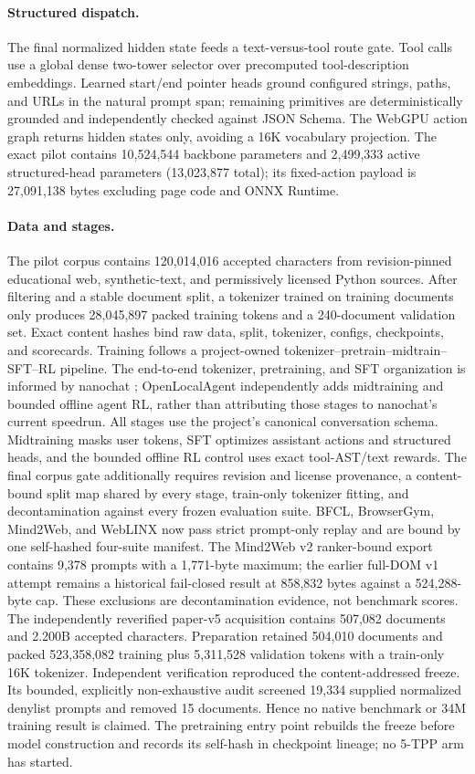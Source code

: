\documentclass{article}
\begin{document}
\paragraph{Structured dispatch.}
The final normalized hidden state feeds a text-versus-tool route gate.  Tool calls use a global
dense two-tower selector over precomputed tool-description embeddings.  Learned start/end pointer
heads ground configured strings, paths, and URLs in the natural prompt span; remaining primitives
are deterministically grounded and independently checked against JSON Schema.  The WebGPU action
graph returns hidden states only, avoiding a 16K vocabulary projection.  The exact pilot contains
10,524,544 backbone parameters and 2,499,333 active structured-head parameters (13,023,877 total);
its fixed-action payload is 27,091,138 bytes excluding page code and ONNX Runtime.

\paragraph{Data and stages.}
The pilot corpus contains 120,014,016 accepted characters from revision-pinned educational web,
synthetic-text, and permissively licensed Python sources.  After filtering and a stable document
split, a tokenizer trained on training documents only produces 28,045,897 packed training tokens
and a 240-document validation set.  Exact content hashes bind raw data, split, tokenizer, configs,
checkpoints, and scorecards.  Training follows a project-owned
tokenizer--pretrain--midtrain--SFT--RL pipeline.  The end-to-end tokenizer, pretraining, and SFT
organization is informed by nanochat \citep{karpathy2025nanochat}; OpenLocalAgent independently adds
midtraining and bounded offline agent RL, rather than attributing those stages to nanochat's
current speedrun.  All stages use the project's canonical conversation schema.  Midtraining masks
user tokens, SFT
optimizes assistant actions and structured heads, and the bounded offline RL control uses exact
tool-AST/text rewards.  The final corpus gate additionally requires revision and license
provenance, a content-bound split map shared by every stage, train-only tokenizer fitting, and
decontamination against every frozen evaluation suite.  BFCL, BrowserGym, Mind2Web, and WebLINX
now pass strict prompt-only replay and are bound by one self-hashed four-suite manifest.  The
Mind2Web v2 ranker-bound export contains 9,378 prompts with a 1,771-byte maximum; the earlier
full-DOM v1 attempt remains a historical fail-closed result at 858,832 bytes against a
524,288-byte cap.  These exclusions are decontamination evidence, not benchmark scores.  The
independently reverified paper-v5 acquisition contains 507,082 documents and 2.200B accepted
characters.  Preparation retained 504,010 documents and packed 523,358,082 training plus
5,311,528 validation tokens with a train-only 16K tokenizer.  Independent verification reproduced
the content-addressed freeze.  Its bounded, explicitly non-exhaustive audit screened 19,334
supplied normalized denylist prompts and removed 15 documents.  Hence no native benchmark or 34M
training result is claimed.  The pretraining entry point rebuilds the freeze before model
construction and records its self-hash in checkpoint lineage; no 5-TPP arm has started.
\end{document}
